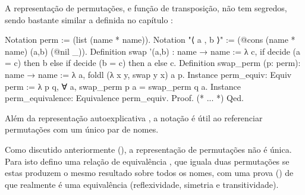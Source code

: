 
A representação de permutações, e função de transposição, não tem segredos, sendo bastante similar a definida no capítulo :
\begin{coqcode}
Notation perm := (list (name * name)).
Notation "⟨ a , b ⟩" := (@cons (name * name) (a,b) (@nil _)).
Definition swap '(a,b) : name → name :=
  λ c, if decide (a = c) then b else if decide (b = c) then a else c.
Definition swap_perm (p: perm): name → name :=
  λ a, foldl (λ x y, swap y x) a p.
Instance perm_equiv: Equiv perm :=
  λ p q, ∀ a, swap_perm p a = swap_perm q a.
Instance perm_equivalence: Equivalence perm_equiv. Proof. (* ... *) Qed.
\end{coqcode}
Além da representação autoexplicativa , a notação  é útil ao referenciar permutações com um único par de nomes.

Como discutido anteriormente (), a representação de permutações não é única. Para isto defino uma relação de equivalência , que iguala duas permutações se estas produzem o mesmo resultado sobre todos os nomes, com uma prova () de que realmente é uma equivalência (reflexividade, simetria e transitividade).
